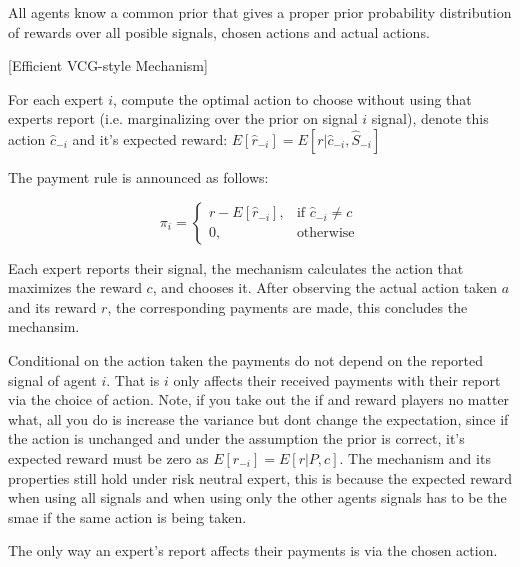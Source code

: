 All agents know a common prior that gives a proper prior probability distribution of rewards over all posible signals, chosen actions and actual actions.

\begin{mech}\label{mech:vcg-style}[Efficient VCG-style Mechanism]



For each expert $i$, compute the optimal action to choose without using that experts report (i.e. marginalizing over the prior on signal $i$ signal), denote this action $\hat{c}_{-i}$ and it's expected reward: $E[\hat{r}_{-i}] = E[ r| \hat{c}_{-i}, \hat{S}_{-i}] $


The payment rule is announced as follows:

\[
    \pi_i = 
\begin{cases}
    r - E[\hat{r}_{-i}] ,& \text{if } \hat{c}_{-i} \neq c\\
    0,              & \text{otherwise}
\end{cases}
\]

%

Each expert reports their signal, the mechanism calculates the action that maximizes the reward $c$, and chooses it. After observing the actual action taken $a$ and its reward $r$, the corresponding payments are made, this concludes the mechansim.

\end{mech}


Conditional on the action taken the payments do not depend on the reported signal of agent $i$. That is $i$ only affects their received payments with their report via the choice of action. 
Note, if you take out the if and reward players no matter what, all you do is increase the variance but dont change the expectation, since if the action is unchanged and under the assumption the prior is correct, it's expected reward must be zero as $E[\hat{r}_{-i}] = E[r|P,c]$. The  mechanism and its properties still hold under risk neutral expert,  this is because the expected reward when using all signals and when using only the other agents signals has to be the smae if the same action is being taken. 


\begin{lem}\label{lem:affect}
	The only way an expert's report affects their payments is via the chosen action.
\end{lem}

